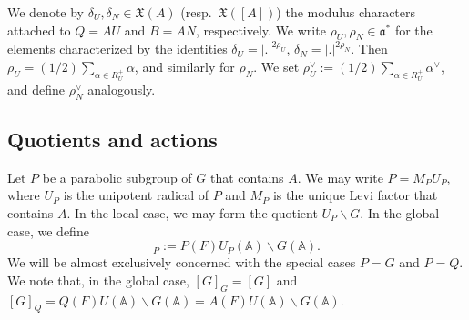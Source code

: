 We denote by $\delta_U, \delta_N \in \mathfrak{X}(A)$ (resp.\ $\mathfrak{X}([A])$) the modulus characters attached to $Q = A U$ and $B = A N$, respectively.  We write $\rho_U, \rho_N \in \mathfrak{a}^*$ for the elements characterized by the identities $\delta_U = |.|^{2 \rho_U}$, $\delta_N = |.|^{2 \rho_N}$.  Then $\rho_U = (1/2) \sum_{\alpha \in R_U^+} \alpha$, and similarly for $\rho_N$.     We set $\rho_U^\vee := (1/2) \sum_{\alpha \in R_U^+} \alpha^\vee$, and define $\rho_N^\vee$ analogously.

\subsection{Quotients and actions}
Let $P$ be a parabolic subgroup of $G$ that contains $A$.  We may write $P = M_P U_P$, where $U_P$ is the unipotent radical of $P$ and $M_P$ is the unique Levi factor that contains $A$.  In the local case, we may form the quotient $U_P \backslash G$.  In the global case, we define 
\begin{equation*}
  [G]_P := P(F) U_P(\mathbb{A}) \backslash G(\mathbb{A}).
\end{equation*}
We will be almost exclusively concerned with the special cases $P = G$ and $P = Q$.  We note that, in the global case, $[G]_G = [G]$ and $[G]_Q = Q(F) U(\mathbb{A}) \backslash G(\mathbb{A}) = A(F) U(\mathbb{A}) \backslash G(\mathbb{A})$.

